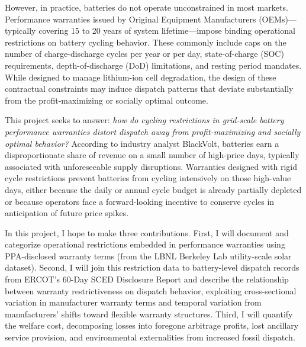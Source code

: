\documentclass[12pt]{article}
\begin{document}
However, in practice, batteries do not operate unconstrained in most markets. Performance warranties issued by Original Equipment Manufacturers (OEMs)---typically covering 15 to 20 years of system lifetime---impose binding operational restrictions on battery cycling behavior. These commonly include caps on the number of charge-discharge cycles per year or per day, state-of-charge (SOC) requirements, depth-of-discharge (DoD) limitations, and resting period mandates. While designed to manage lithium-ion cell degradation, the design of these contractual constraints may induce dispatch patterns that deviate substantially from the profit-maximizing or socially optimal outcome.

This project seeks to answer: \textit{how do cycling restrictions in grid-scale battery performance warranties distort dispatch away from profit-maximizing and socially optimal behavior?}  According to industry analyst BlackVolt, batteries earn a disproportionate share of revenue on a small number of high-price days, typically associated with unforeseeable supply disruptions. Warranties designed with rigid cycle restrictions prevent batteries from cycling intensively on  those high-value days, either because the daily or annual cycle budget is already partially depleted or because operators face a forward-looking incentive to conserve cycles in anticipation of future price spikes. 

In this project, I hope to make three contributions. First, I will document and categorize operational restrictions embedded in performance warranties using PPA-disclosed warranty terms (from the LBNL Berkeley Lab utility-scale solar dataset). Second, I will join this restriction data to battery-level dispatch records from ERCOT's 60-Day SCED Disclosure Report and describe the relationship between warranty restrictiveness on dispatch behavior, exploiting cross-sectional variation in manufacturer warranty terms and temporal variation from manufacturers' shifts toward flexible warranty structures. Third, I will quantify the welfare cost, decomposing losses into foregone arbitrage profits, lost ancillary service provision, and environmental externalities from increased fossil dispatch.
\end{document}
